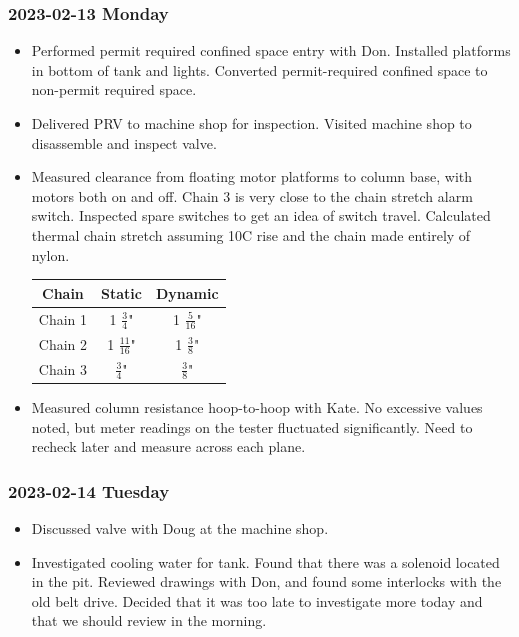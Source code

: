 \documentclass{scrartcl}
\begin{document}
\subsubsection{2023-02-13 Monday}
\begin{itemize}
	\item Performed permit required confined space entry with Don.  Installed platforms in bottom of tank and lights.  
	Converted permit-required confined space to non-permit required space.
	\item Delivered PRV to machine shop for inspection.  Visited machine
	shop to disassemble and inspect valve.  
	\item Measured clearance from floating motor platforms to column base, with motors 
	both on and off.  Chain 3  is very close to the chain stretch alarm switch.  
	Inspected spare switches to get an idea of switch travel.  Calculated thermal chain 
	stretch assuming 10\degree C rise and the chain made entirely of nylon.
	\begin{center}
		\def\arraystretch{1.3}
		\begin{tabular}{ |c|c|c| }
			\hline
			Chain & Static & Dynamic \\
			\hline
			Chain 1 & 1 \(\frac{3}{4}\)" & 1 \(\frac{5}{16}\)" \\
			Chain 2 & 1 \(\frac{11}{16}\)" & 1 \(\frac{3}{8}\)" \\
			Chain 3 & \(\frac{3}{4}\)" & \(\frac{3}{8}\)" \\
			\hline
		\end{tabular}
	\end{center}
	\item Measured column resistance hoop-to-hoop with Kate.  No excessive 
	values noted, but meter readings on the tester fluctuated significantly.
	Need to recheck later and measure across each plane.
\end{itemize}

\subsubsection{2023-02-14 Tuesday}
\begin{itemize}
    \item Discussed valve with Doug at the machine shop.
    \item Investigated cooling water for tank.  Found that there was a
    solenoid located in the pit.  Reviewed drawings with Don, and found 
	some interlocks with the old belt drive.  Decided that it was too late 
	to investigate more today and that we should review in the morning.
\end{itemize}
\end{document}
